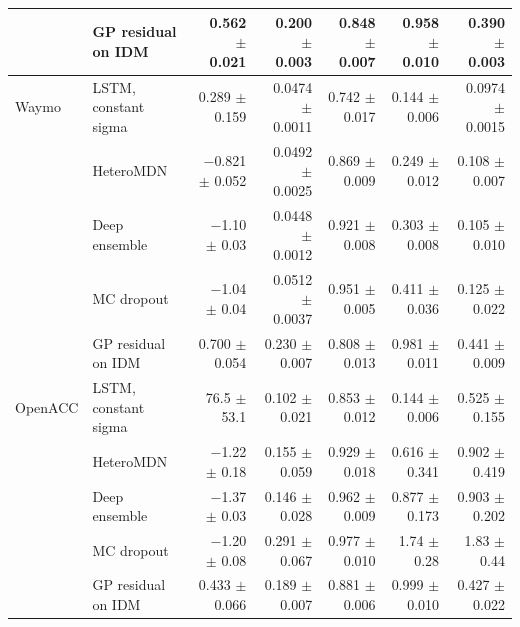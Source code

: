 \begin{table}[htbp]
\begin{tabular}{llrrrrr}
 & GP residual on IDM & 0.562 $\pm$ 0.021 & 0.200 $\pm$ 0.003 & 0.848 $\pm$ 0.007 & 0.958 $\pm$ 0.010 & 0.390 $\pm$ 0.003 \\
\midrule
Waymo & LSTM, constant sigma & 0.289 $\pm$ 0.159 & 0.0474 $\pm$ 0.0011 & 0.742 $\pm$ 0.017 & 0.144 $\pm$ 0.006 & 0.0974 $\pm$ 0.0015 \\
 & HeteroMDN & $-$0.821 $\pm$ 0.052 & 0.0492 $\pm$ 0.0025 & 0.869 $\pm$ 0.009 & 0.249 $\pm$ 0.012 & 0.108 $\pm$ 0.007 \\
 & Deep ensemble & $-$1.10 $\pm$ 0.03 & 0.0448 $\pm$ 0.0012 & 0.921 $\pm$ 0.008 & 0.303 $\pm$ 0.008 & 0.105 $\pm$ 0.010 \\
 & MC dropout & $-$1.04 $\pm$ 0.04 & 0.0512 $\pm$ 0.0037 & 0.951 $\pm$ 0.005 & 0.411 $\pm$ 0.036 & 0.125 $\pm$ 0.022 \\
 & GP residual on IDM & 0.700 $\pm$ 0.054 & 0.230 $\pm$ 0.007 & 0.808 $\pm$ 0.013 & 0.981 $\pm$ 0.011 & 0.441 $\pm$ 0.009 \\
\midrule
OpenACC & LSTM, constant sigma & 76.5 $\pm$ 53.1 & 0.102 $\pm$ 0.021 & 0.853 $\pm$ 0.012 & 0.144 $\pm$ 0.006 & 0.525 $\pm$ 0.155 \\
 & HeteroMDN & $-$1.22 $\pm$ 0.18 & 0.155 $\pm$ 0.059 & 0.929 $\pm$ 0.018 & 0.616 $\pm$ 0.341 & 0.902 $\pm$ 0.419 \\
 & Deep ensemble & $-$1.37 $\pm$ 0.03 & 0.146 $\pm$ 0.028 & 0.962 $\pm$ 0.009 & 0.877 $\pm$ 0.173 & 0.903 $\pm$ 0.202 \\
 & MC dropout & $-$1.20 $\pm$ 0.08 & 0.291 $\pm$ 0.067 & 0.977 $\pm$ 0.010 & 1.74 $\pm$ 0.28 & 1.83 $\pm$ 0.44 \\
 & GP residual on IDM & 0.433 $\pm$ 0.066 & 0.189 $\pm$ 0.007 & 0.881 $\pm$ 0.006 & 0.999 $\pm$ 0.010 & 0.427 $\pm$ 0.022 \\
\bottomrule
\end{tabular}
\end{table}
